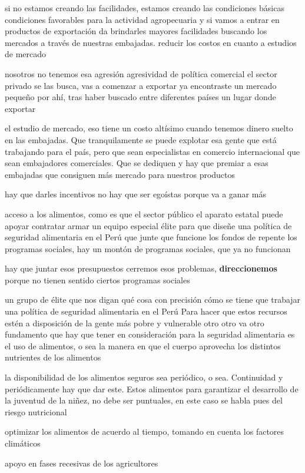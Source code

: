 \documentclass[
  letterpaper,
  DIV=11,
  numbers=noendperiod]{scrartcl}
\begin{document}
si no estamos creando las facilidades, estamos creando las condiciones
básicas condiciones favorables para la actividad agropecuaria y si vamos
a entrar en productos de exportación da brindarles mayores facilidades
buscando los mercados a través de nuestras embajadas. reducir los costos
en cuanto a estudios de mercado

nosotros no tenemos esa agresión agresividad de política comercial el
sector privado se las busca, vas a comenzar a exportar ya encontraste un
mercado pequeño por ahí, tras haber buscado entre diferentes países un
lugar donde exportar

el estudio de mercado, eso tiene un costo altísimo cuando tenemos dinero
suelto en las embajadas. Que tranquilamente se puede explotar esa gente
que está trabajando para el país, pero que sean especialistas en
comercio internacional que sean embajadores comerciales. Que se dediquen
y hay que premiar a esas embajadas que consiguen más mercado para
nuestros productos

hay que darles incentivos no hay que ser egoístas porque va a ganar más

acceso a los alimentos, como es que el sector público el aparato estatal
puede apoyar contratar armar un equipo especial élite para que diseñe
una política de seguridad alimentaria en el Perú que junte que funcione
los fondos de repente los programas sociales, hay un montón de programas
sociales, que ya no funcionan

hay que juntar esos presupuestos cerremos esos problemas,
\textbf{direccionemos} porque no tienen sentido ciertos programas
sociales

un grupo de élite que nos digan qué cosa con precisión cómo se tiene que
trabajar una política de seguridad alimentaria en el Perú Para hacer que
estos recursos estén a disposición de la gente más pobre y vulnerable
otro otro va otro fundamento que hay que tener en consideración para la
seguridad alimentaria es el uso de alimentos, o sea la manera en que el
cuerpo aprovecha los distintos nutrientes de los alimentos

la disponibilidad de los alimentos seguros sea periódico, o sea.
Continuidad y periódicamente hay que dar este. Estos alimentos para
garantizar el desarrollo de la juventud de la niñez, no debe ser
puntuales, en este caso se habla pues del riesgo nutricional

optimizar los alimentos de acuerdo al tiempo, tomando en cuenta los
factores climáticos

apoyo en fases recesivas de los agricultores
\end{document}
